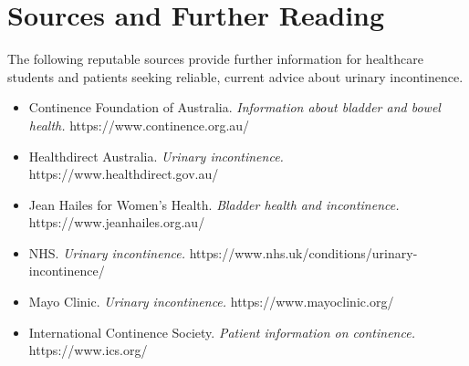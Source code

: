 \section*{Sources and Further Reading}
The following reputable sources provide further information for healthcare students and patients seeking reliable, current advice about urinary incontinence.
\begin{itemize}
    \item Continence Foundation of Australia. \textit{Information about bladder and bowel health.} https://www.continence.org.au/
    \item Healthdirect Australia. \textit{Urinary incontinence.} https://www.healthdirect.gov.au/
    \item Jean Hailes for Women's Health. \textit{Bladder health and incontinence.} https://www.jeanhailes.org.au/
    \item NHS. \textit{Urinary incontinence.} https://www.nhs.uk/conditions/urinary-incontinence/
    \item Mayo Clinic. \textit{Urinary incontinence.} https://www.mayoclinic.org/
    \item International Continence Society. \textit{Patient information on continence.} https://www.ics.org/
\end{itemize}

